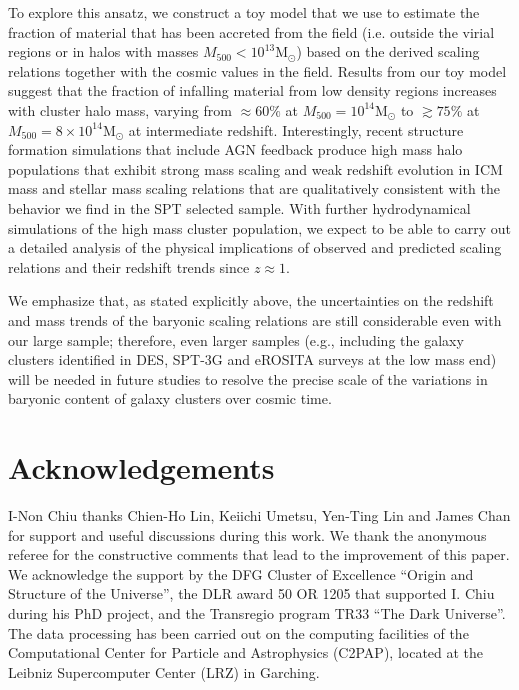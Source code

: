 \documentclass[useAMS,usenatbib,iop,numberedappendix]{mn2e}
\newcommand{\Msun}{\ensuremath{\mathrm{M}_{\odot}}}
\newcommand{\Mfiveoo}{\ensuremath{M_{500}}}
\newcommand{\percent}{\ensuremath{\%}}
\begin{document}
To explore this ansatz, we construct a toy model that we use to estimate the fraction of material that has been accreted from the field (i.e. outside the virial regions or in halos with masses $\Mfiveoo<10^{13}\Msun$) based on the derived scaling relations together with the cosmic values in the field.  Results from our toy model suggest that the fraction of infalling material from low density regions increases with cluster halo mass, varying from $\approx60\percent$ at $\Mfiveoo=10^{14}\Msun$ to $\gtrsim75\percent$ at $\Mfiveoo=8\times10^{14}\Msun$ at intermediate redshift.  Interestingly, recent structure formation simulations that include AGN feedback produce high mass halo populations that exhibit strong mass scaling and weak redshift evolution in ICM mass and stellar mass scaling relations \citep{wu15, truong16, barnes17, lebrun17} that are qualitatively consistent with the behavior we find in the SPT selected sample.   With further hydrodynamical simulations of the high mass cluster population, we expect to be able to carry out a detailed analysis of the physical implications of observed and predicted scaling relations and their redshift trends since $z\approx1$.

We emphasize that, as stated explicitly above, the uncertainties on the redshift and mass trends of the baryonic scaling relations are still considerable even with our large sample; therefore, even larger samples (e.g., including the galaxy clusters identified in DES, SPT-3G and eROSITA surveys at the low mass end) will be needed in future studies to resolve the precise scale of the variations in baryonic content of galaxy clusters over cosmic time.  


%
%

\section*{Acknowledgements}
\label{sec:acknowledgements}

I-Non Chiu thanks Chien-Ho Lin, Keiichi Umetsu, Yen-Ting Lin and James Chan for support and useful discussions during this work.
We thank the anonymous referee for the constructive comments that lead to the improvement of this paper.
We acknowledge the support by the DFG Cluster of Excellence ``Origin and Structure of the Universe'', the DLR award 50 OR 1205 that supported I. Chiu during his PhD project, and the Transregio program TR33 ``The Dark Universe''.   
The data processing has been carried out on the computing facilities of the Computational Center for Particle and Astrophysics (C2PAP), located at the Leibniz Supercomputer Center (LRZ) in Garching.  
\end{document}
